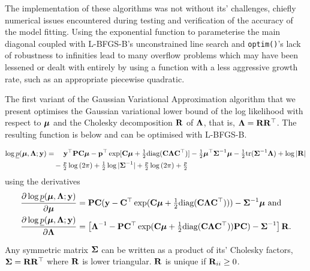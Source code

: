 \documentclass{amsart}[12pt]
\begin{document}
	The implementation of these algorithms was not without its' challenges, chiefly numerical issues encountered during testing and verification of the accuracy of the model fitting. Using the exponential function to parameterise the main diagonal coupled with L-BFGS-B's unconstrained line search and \texttt{optim()}'s lack of robustness to infinities lead to many overflow problems which may have been lessened or dealt with entirely by using a function with a less aggressive growth rate, such as an appropriate piecewise quadratic.

	The first variant of the Gaussian Variational Approximation algorithm that we present optimises the
	Gaussian variational lower bound of the log likelihood with respect to ${\boldsymbol \mu}$ and the Cholesky decomposition
	${\bf R}$ of   ${\boldsymbol \Lambda}$, that is, ${\boldsymbol \Lambda} = {\bf R} {\bf R}^\top$. The resulting function is below and can be
	optimised with L-BFGS-B.
	
	\begin{align*}
		\log \underline{p}({\boldsymbol \mu}, {\boldsymbol \Lambda}; {\bf y}) & = \quad {\bf y}^\top{\bf P} {\bf C} {\boldsymbol\mu} - {\bf p}^\top \exp[{\bf C} {\boldsymbol \mu} + \tfrac{1}{2} \text{diag}({\bf C} {\boldsymbol \Lambda} {\bf C}^\top)] - \tfrac{1}{2} {\boldsymbol \mu}^\top {\boldsymbol\Sigma}^{-1} {\boldsymbol \mu} - \tfrac{1}{2} \text{tr}{({\boldsymbol\Sigma}^{-1} {\boldsymbol\Lambda})} + \log{|{\bf R}|} \\
		                                        & \quad - \tfrac{p}{2} \log{(2 \pi)} + \tfrac{1}{2} \log{|{\boldsymbol\Sigma}^{-1}|} + \tfrac{p}{2} \log{(2 \pi)} + \tfrac{p}{2}                                                                              
	\end{align*}
	using the derivatives
	\begin{align*}
		\frac{\partial \log \underline{p}({\boldsymbol \mu}, {\boldsymbol \Lambda}; {\bf y})}{\partial {\boldsymbol\mu}}     & = {\bf P} {\bf C} ({\bf y} - {\bf C}^\top \exp({\bf C} {\boldsymbol \mu} + \tfrac{1}{2} \text{diag}{({\bf C}{\boldsymbol\Lambda}{\bf C}^\top)})) - {\boldsymbol \Sigma}^{-1} {\boldsymbol \mu} \text{ and}                \\
		\frac{\partial \log \underline{p}({\boldsymbol \mu}, {\boldsymbol \Lambda}; {\bf y})}{\partial {\boldsymbol\Lambda}} & = \left [{\boldsymbol \Lambda}^{-1} - {\bf P} {\bf C}^\top \exp({\bf C} {\boldsymbol \mu} + \tfrac{1}{2} \text{diag}({\bf C} {\boldsymbol \Lambda} {\bf C}^\top)) {\bf P} {\bf C}) - {\boldsymbol \Sigma}^{-1} \right ] {\bf R}. 
	\end{align*}

	\noindent Any symmetric matrix ${\boldsymbol \Sigma}$ can be written as a product of its' Cholesky factors, ${\boldsymbol \Sigma} =
	{\bf R} {\bf R}^\top$   where ${\bf R}$ is lower triangular. ${\bf R}$ is unique if ${\bf R}_{ii} \geq 0$.
	
\end{document}
